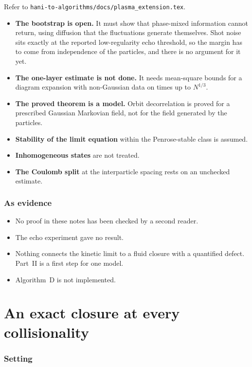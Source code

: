 \documentclass[11pt]{article}
\theoremstyle{remark}
\begin{document}
Refer to \texttt{hani-to-algorithms/docs/plasma\_extension.tex}.
\begin{itemize}
  \item \textbf{The bootstrap is open.} It must show that phase-mixed
    information cannot return, using diffusion that the fluctuations generate
    themselves. Shot noise sits exactly at the reported low-regularity echo
    threshold, so the margin has to come from independence of the particles,
    and there is no argument for it yet.
  \item \textbf{The one-layer estimate is not done.} It needs mean-square
    bounds for a diagram expansion with non-Gaussian data on times up to
    $N^{1/3}$.
  \item \textbf{The proved theorem is a model.} Orbit decorrelation is
    proved for a prescribed Gaussian Markovian field, not for the field
    generated by the particles.
  \item \textbf{Stability of the limit equation} within the Penrose-stable
    class is assumed.
  \item \textbf{Inhomogeneous states} are not treated.
  \item \textbf{The Coulomb split} at the interparticle spacing rests on an
    unchecked estimate.
\end{itemize}

\section{As evidence}

\begin{itemize}
  \item No proof in these notes has been checked by a second reader.
  \item The echo experiment gave no result.
  \item Nothing connects the kinetic limit to a fluid closure with a
    quantified defect. Part~II is a first step for one model.
  \item Algorithm~D is not implemented.
\end{itemize}

\part{An exact closure at every collisionality}

\section{Setting}
\end{document}
